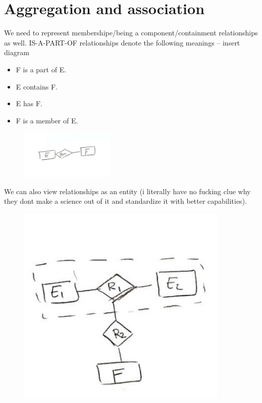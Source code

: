 \section{Aggregation and association}
We need to represent membershipe/being a component/containment relationships as well. IS-A-PART-OF relationships denote the following meanings 
-- insert diagram
\begin{itemize}
    \item F is a part of E.
    \item E contains F.
    \item E has F.
    \item F is a member of E.
\end{itemize}
\begin{figure}
    \centering
    \includegraphics[width = 0.4\textwidth]{Graphics/has}
\end{figure}
We can also view relationships as an entity (i literally have no fucking clue why they dont make a science out of it and standardize it with better capabilities).
\begin{figure}
    \centering
    \includegraphics[width = 0.9\textwidth]{Graphics/aggregation.jpg}
\end{figure}
